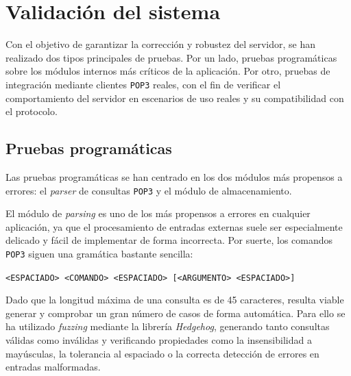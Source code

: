 \documentclass[a4paper]{CSMakotoTechnicalReport}
\begin{document}


\section{Validación del sistema}

Con el objetivo de garantizar la corrección y robustez del servidor, se han realizado dos tipos principales de pruebas. Por un lado, pruebas programáticas sobre los módulos internos más críticos de la aplicación. Por otro, pruebas de integración mediante clientes \texttt{POP3} reales, con el fin de verificar el comportamiento del servidor en escenarios de uso reales y su compatibilidad con el protocolo.


\subsection{Pruebas programáticas}

Las pruebas programáticas se han centrado en los dos módulos más propensos a errores: el \textit{parser} de consultas \texttt{POP3} y el módulo de almacenamiento.

El módulo de \textit{parsing} es uno de los más propensos a errores en cualquier aplicación, ya que el procesamiento de entradas externas suele ser especialmente delicado y fácil de implementar de forma incorrecta. Por suerte, los comandos \texttt{POP3} siguen una gramática bastante sencilla:

\begin{center}
    \texttt{<ESPACIADO> <COMANDO> <ESPACIADO> [<ARGUMENTO> <ESPACIADO>]}
\end{center}

Dado que la longitud máxima de una consulta es de 45 caracteres, resulta viable generar y comprobar un gran número de casos de forma automática. Para ello se ha utilizado \textit{fuzzing} mediante la librería \textit{Hedgehog}, generando tanto consultas válidas como inválidas y verificando propiedades como la insensibilidad a mayúsculas, la tolerancia al espaciado o la correcta detección de errores en entradas malformadas.
\end{document}
